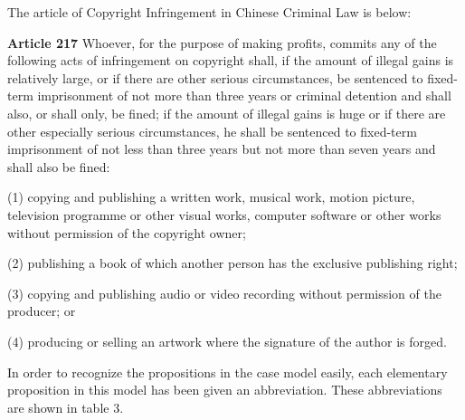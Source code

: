 \documentclass{IOS-Book-Article}
\begin{document}



\noindent The article of Copyright Infringement in Chinese Criminal Law\cite{StateCouncil2015series} is below:
\newline

\begin{adjustwidth}{0.5cm}{0cm}
\noindent \textbf{Article 217} Whoever, for the purpose of making profits, commits any of the following acts of infringement on copyright shall, if the amount of illegal gains is relatively large, or if there are other serious circumstances, be sentenced to fixed-term imprisonment of not more than three years or criminal detention and shall also, or shall only, be fined; if the amount of illegal gains is huge or if there are other especially serious circumstances, he shall be sentenced to fixed-term imprisonment of not less than three years but not more than seven years and shall also be fined:

\noindent (1) copying and publishing a written work, musical work, motion picture, television programme or other visual works, computer software or other works without permission of the copyright owner;

\noindent (2) publishing a book of which another person has the exclusive publishing right;

\noindent (3) copying and publishing audio or video recording without permission of the producer; or

\noindent (4) producing or selling an artwork where the signature of the author is forged.\newline
\end{adjustwidth}


In order to recognize the propositions in the case model easily, each elementary proposition in this model has been given an abbreviation. These abbreviations are shown in table 3.
\end{document}
